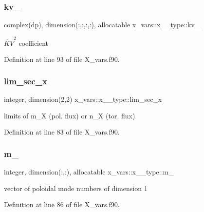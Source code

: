 \subsubsection{\texorpdfstring{kv\+\_}{kv\_2}}
{\footnotesize\ttfamily complex(dp), dimension(\+:,\+:,\+:,\+:), allocatable x\+\_\+vars\+::x\+\_\+\_\+type\+::kv\+\_}



$\widetilde{KV}^2$ coefficient 



Definition at line 93 of file X\+\_\+vars.\+f90.

\mbox{\label{structx__vars_1_1x__2__type_aac1744d056531f6fe7f7426dd4fcd92b}} 
\subsubsection{\texorpdfstring{lim\+\_\+sec\+\_\+x}{lim\_sec\_x}}
{\footnotesize\ttfamily integer, dimension(2,2) x\+\_\+vars\+::x\+\_\+\_\+type\+::lim\+\_\+sec\+\_\+x}



limits of {\ttfamily m\+\_\+X} (pol. flux) or {\ttfamily n\+\_\+X} (tor. flux) 



Definition at line 83 of file X\+\_\+vars.\+f90.

\mbox{\label{structx__vars_1_1x__2__type_a024dedf39f2364d4593fe1bc0c195b10}} 
\subsubsection{\texorpdfstring{m\+\_}{m\_1}}
{\footnotesize\ttfamily integer, dimension(\+:,\+:), allocatable x\+\_\+vars\+::x\+\_\+\_\+type\+::m\+\_}



vector of poloidal mode numbers of dimension 1 



Definition at line 86 of file X\+\_\+vars.\+f90.

